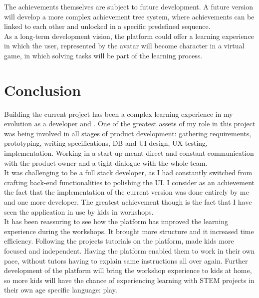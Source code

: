 The achievements themselves are subject to future development. A future version will develop a more complex achievement tree system, where achievements can be linked to each other and unlocked in a specific predefined sequence. \\

As a long-term development vision, the platform could offer a learning experience in which the user, represented by the avatar will become character in a virtual game, in which solving tasks will be part of the learning process. \\


\chapter{Conclusion}

Building the current project has been a complex learning experience in my evolution as a developer and . 
One of the greatest assets of my role in this project was being involved in all stages of product development: gathering requirements, prototyping, writing specifications, DB and UI design, UX testing, implementation. Working in a start-up meant direct and constant communication with the product owner and a tight dialogue with the whole team. \\

It was challenging to be a full stack developer, as I had constantly switched from crafting back-end functionalities to polishing the UI. I consider as an achievement the fact that the implementation of the current version was done entirely by me and one more developer. The greatest achievement though is the fact that I have seen the application in use by kids in workshops. \\

It has been reassuring to see how the platform has improved the learning experience during the workshops. It brought more structure and it increased time efficiency. Following the projects tutorials on the platform, made kids more focused and independent. Having the platform enabled them to work in their own pace, without tutors having to explain same instructions all over again. Further development of the platform will bring the workshop experience to kids at home, so more kids will have the chance of experiencing learning with STEM projects in their own age specific language: play.\\





